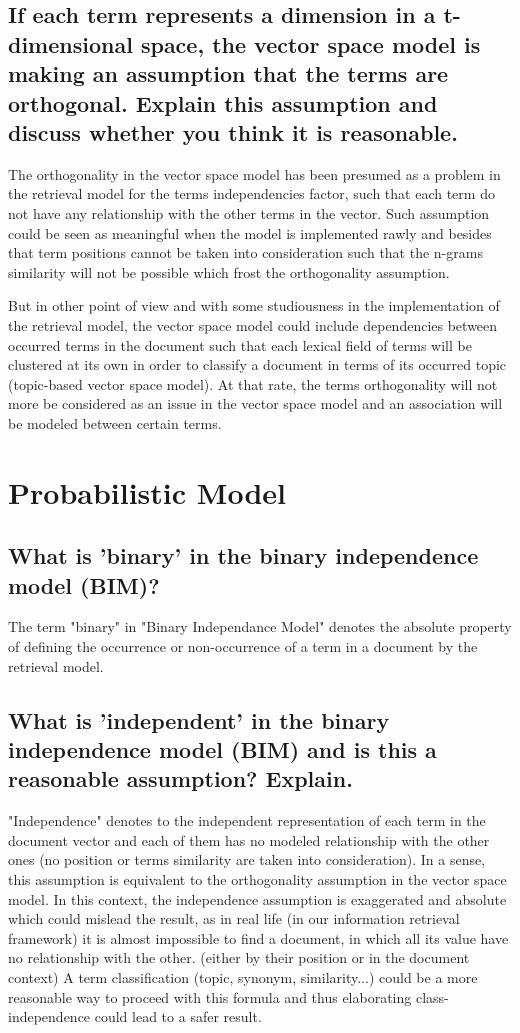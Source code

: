 \documentclass{scrartcl}
\begin{document}
\subsection{If each term represents a dimension in a t-dimensional space, the vector space model is making an assumption that the terms are orthogonal. Explain this assumption and discuss whether you think it is reasonable.}

The orthogonality in the vector space model has been presumed as a problem in the retrieval model for the terms independencies factor, such that each term do not have any relationship with the other terms in the vector. Such assumption could be seen as meaningful when the model is implemented rawly and besides that term positions cannot be taken into consideration such that the n-grams similarity will not be possible which frost the orthogonality assumption.

But in other point of view and with some studiousness in the implementation of the retrieval model, the vector space model could include dependencies between occurred terms in the document such that each lexical field of terms will be clustered at its own in order to classify a document in terms of its occurred topic (topic-based vector space model). At that rate, the terms orthogonality will not more be considered as an issue in the vector space model and an association will be modeled between certain terms.

\section{Probabilistic Model}

\subsection{What is ’binary’ in the binary independence model (BIM)? }

The term "binary" in "Binary Independance Model" denotes the absolute property of defining the occurrence or non-occurrence of a term in a document by the retrieval model.

\subsection{What is ’independent’ in the binary independence model (BIM) and is this a reasonable
assumption? Explain. }

"Independence" denotes to the independent representation of each term in the document vector and each of them has no modeled relationship with the other ones (no position or terms similarity are taken into consideration). In a sense, this assumption is equivalent to the orthogonality assumption in the vector space model. In this context, the independence assumption is exaggerated and absolute which could mislead the result, as in real life (in our information retrieval framework) it is almost impossible to find a document, in which all its value have no relationship with the other. (either by their position or in the document context) A term classification (topic, synonym, similarity...) could be a more reasonable way to proceed with this formula and thus elaborating class-independence could lead to a safer result.
\end{document}
